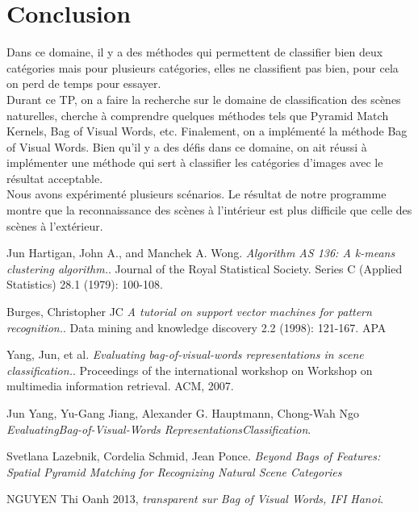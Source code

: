 \documentclass[french,12pt,a4paper,oneside,notitlepage]{report}
\begin{document}
\section{Conclusion}
Dans ce domaine, il y a des méthodes qui permettent de classifier bien deux catégories mais pour plusieurs catégories, elles ne classifient pas bien, pour cela on perd de temps pour essayer.\\
Durant ce TP, on a faire la recherche sur le domaine de classification des scènes 
naturelles, cherche à comprendre quelques méthodes tels que Pyramid Match Kernels, Bag of 
Visual Words, etc. Finalement, on a implémenté la méthode Bag of Visual Words. Bien qu'il 
y a des défis dans ce domaine, on ait réussi à implémenter une méthode qui sert à 
classifier les catégories d'images avec le résultat acceptable.\\
Nous avons expérimenté plusieurs scénarios. Le résultat de notre programme montre que la 
reconnaissance des scènes à l'intérieur est plus difficile que celle des scènes à 
l'extérieur. 
\begin{thebibliography}{9}
  Jun Hartigan, John A., and Manchek A. Wong.
  \emph{Algorithm AS 136: A k-means clustering algorithm.}.
  Journal of the Royal Statistical Society. Series C (Applied Statistics) 28.1 (1979): 100-108.
  
  Burges, Christopher JC
  \emph{A tutorial on support vector machines for pattern recognition.}.
  Data mining and knowledge discovery 2.2 (1998): 121-167. APA	
  
	Yang, Jun, et al.
  \emph{Evaluating bag-of-visual-words representations in scene classification.}.
  Proceedings of the international workshop on Workshop on multimedia information retrieval. ACM, 2007.

  Jun Yang, Yu-Gang Jiang, Alexander G. Hauptmann, Chong-Wah Ngo
  \emph{EvaluatingBag-of-Visual-Words RepresentationsClassification}.

  Svetlana Lazebnik, Cordelia Schmid, Jean Ponce.
  \emph{Beyond Bags of Features: Spatial Pyramid Matching for Recognizing Natural Scene Categories}
  
  NGUYEN Thi Oanh 2013,
  \emph{transparent sur Bag of Visual Words, IFI Hanoi}.
  
\end{thebibliography}
\end{document}
